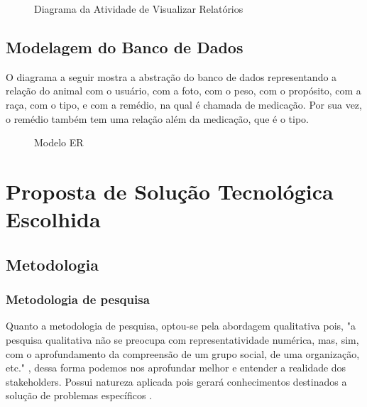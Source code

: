 \documentclass[12pt]{article}
\begin{document}
\begin{figure}[!h]
	\begin{center}
		\caption{Diagrama da Atividade de Visualizar Relatórios}

	\end{center}
\end{figure}

\newpage

\subsection{Modelagem do Banco de Dados}

O diagrama a seguir mostra a abstração do banco de dados representando a relação do animal com o usuário, com a foto, com o peso, com o propósito, com a raça, com o tipo, e com a remédio, na qual é chamada de medicação. Por sua vez, o remédio também tem uma relação além da medicação, que é o tipo.  

\begin{figure}[!h]
	\begin{center}
		\caption{Modelo ER}


	\end{center}
\end{figure}

\newpage

\section{Proposta de Solução Tecnológica Escolhida}

\subsection{Metodologia}

\subsubsection{Metodologia de pesquisa}

Quanto a metodologia de pesquisa, optou-se pela abordagem qualitativa pois, "a pesquisa qualitativa não se preocupa com representatividade numérica, mas, sim, com o aprofundamento da compreensão de um grupo social, de uma organização, etc." \cite{ufrgs09}, dessa forma podemos nos aprofundar melhor e entender a realidade dos stakeholders. Possui natureza aplicada pois gerará conhecimentos destinados a solução de problemas específicos \cite{ufrgs09} .
\end{document}

